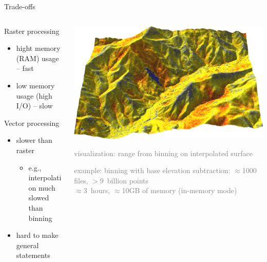 \documentclass[xcolor={dvipsnames,usenames},beamer,aspectratio=43]{beamer}
\begin{document}
\begin{frame}{Trade-offs}

\begin{columns}
\begin{column}{0.44\textwidth}

Raster processing

\begin{itemize}
  \item hight memory (RAM) usage -- fast
  \item low memory usage (high I/O) -- slow
\end{itemize}

Vector processing

\begin{itemize}
  \item slower than raster
  \begin{itemize}
  \item e.g., interpolation much slowed than binning
  \end{itemize}
  \item hard to make general statements
\end{itemize}

\end{column}
\begin{column}{0.44\textwidth}

\includegraphics[width=\textwidth]{grass/range_on_ground_from_north}
  \begin{center}
  \tiny
  \textcolor{gray}{
  visualization: range from binning on interpolated surface
  }
  \end{center}

\bigskip

\textcolor{gray}{
\footnotesize
example: binning with base elevation subtraction: $\approx$1000 files, $>9$~billion points
\\
$\approx$3~hours, $\approx$10GB of memory \tiny (in-memory mode)
}

\end{column}
\end{columns}

\end{frame}
\end{document}
